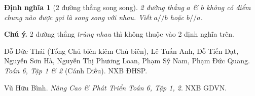 \documentclass{article}
\numberwithin{equation}{section}
\newtheorem{definition}{Định nghĩa}[section]
\begin{document}
\begin{definition}[2 đường thẳng song song]
	2 đường thẳng $a$ \& $b$ không có điểm chung nào được gọi là \emph{song song với nhau}. Viết $a//b$ hoặc $b//a$.
\end{definition}
\textbf{Chú ý.} 2 đường thẳng \emph{trùng nhau} thì không thuộc vào 2 định nghĩa trên. 






\begin{thebibliography}{99}
	 Đỗ Đức Thái (Tổng Chủ biên kiêm Chủ biên), Lê Tuấn Anh, Đỗ Tiến Đạt, Nguyễn Sơn Hà, Nguyễn Thị Phương Loan, Phạm Sỹ Nam, Phạm Đức Quang. \textit{Toán 6, Tập 1 \& 2} (Cánh Diều). NXB ĐHSP.
	
	 Vũ Hữu Bình. \textit{Nâng Cao \& Phát Triển Toán 6, Tập 1, 2}. NXB GDVN.
\end{thebibliography}

\printbibliography[heading=bibintoc]
	
\end{document}
